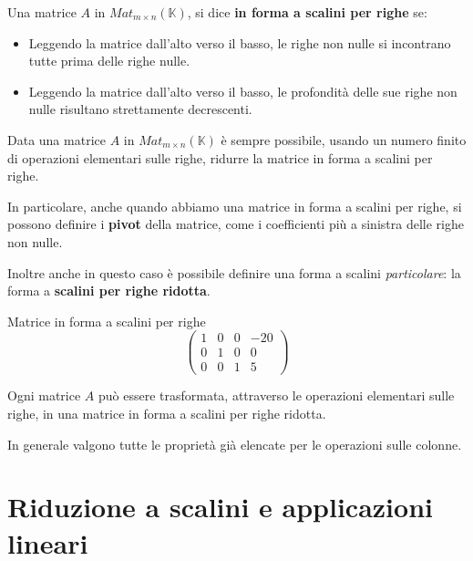 \begin{defn}
	Una matrice $A$ in $Mat_{m \times n}(\mathbb{K})$, si dice \textbf{in forma
		a scalini per righe} se:
	\begin{itemize}
		\item Leggendo la matrice dall'alto verso il basso, le righe non nulle si
		      incontrano tutte prima delle righe nulle.
		\item Leggendo la matrice dall'alto verso il basso, le profondit\`a
		      delle sue righe non nulle risultano strettamente decrescenti.
	\end{itemize}
\end{defn}

\begin{theorem}
	Data una matrice $A$ in $Mat_{m \times n}(\mathbb{K})$ \`e sempre possibile,
	usando un numero finito di operazioni elementari sulle righe, ridurre la
	matrice in forma a scalini per righe.
\end{theorem}

In particolare, anche quando abbiamo una matrice in forma a scalini per righe, si
possono definire i \textbf{pivot} della matrice, come i coefficienti pi\`u a
sinistra delle righe non nulle.

Inoltre anche in questo caso \`e possibile definire una forma a scalini
\emph{particolare}: la forma a \textbf{scalini per righe ridotta}.

\begin{example}
	Matrice in forma a scalini per righe
	\begin{equation*}
		\begin{pmatrix}
			1 & 0 & 0 & -20 \\
			0 & 1 & 0 & 0   \\
			0 & 0 & 1 & 5
		\end{pmatrix}
	\end{equation*}
\end{example}

\begin{corollary}
	Ogni matrice $A$ pu\`o essere trasformata, attraverso le operazioni elementari
	sulle righe, in una matrice in forma a scalini per righe ridotta.
\end{corollary}

In generale valgono tutte le propriet\`a gi\`a elencate per le operazioni sulle
colonne.

\section{Riduzione a scalini e applicazioni lineari}

